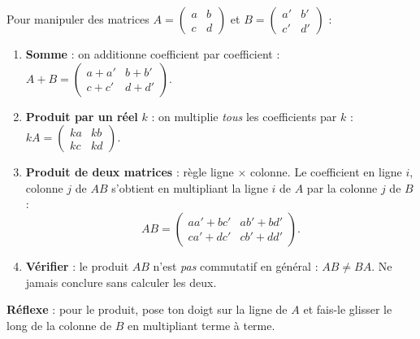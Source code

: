 \documentclass[11pt]{article}
\newcommand{\cle}[1]{{\popxbold\color{popdark}#1}}
\begin{document}
\begin{methode}
Pour manipuler des matrices $A=\begin{pmatrix} a & b \\ c & d \end{pmatrix}$ et $B=\begin{pmatrix} a' & b' \\ c' & d' \end{pmatrix}$ :
\begin{enumerate}
\item \textbf{Somme} : on additionne \cle{coefficient par coefficient} : $A+B=\begin{pmatrix} a+a' & b+b' \\ c+c' & d+d' \end{pmatrix}$.
\item \textbf{Produit par un réel} $k$ : on multiplie \emph{tous} les coefficients par $k$ : $kA=\begin{pmatrix} ka & kb \\ kc & kd \end{pmatrix}$.
\item \textbf{Produit de deux matrices} : règle \cle{ligne $\times$ colonne}. Le coefficient en ligne $i$, colonne $j$ de $AB$ s'obtient en multipliant la ligne $i$ de $A$ par la colonne $j$ de $B$ :
\[ AB=\begin{pmatrix} aa'+bc' & ab'+bd' \\ ca'+dc' & cb'+dd' \end{pmatrix}. \]
\item \textbf{Vérifier} : le produit $AB$ n'est \emph{pas} commutatif en général : $AB\neq BA$. Ne jamais conclure sans calculer les deux.
\end{enumerate}
\textbf{Réflexe} : pour le produit, pose ton doigt sur la ligne de $A$ et fais-le glisser le long de la colonne de $B$ en multipliant terme à terme.
\end{methode}
\end{document}
